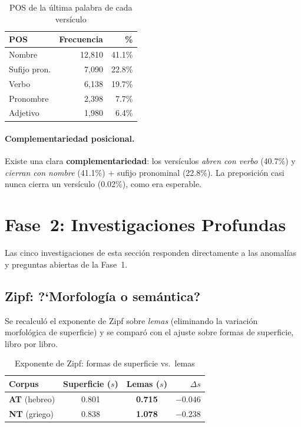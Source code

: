 \documentclass[12pt,a4paper]{article}
\newcommand{\ot}{\textcolor{otcolor}{\textbf{AT}}}
\newcommand{\nt}{\textcolor{ntcolor}{\textbf{NT}}}
\newcommand{\val}[1]{\textcolor{hlcolor}{\textbf{#1}}}
\begin{document}
\begin{table}[H]
\centering
\caption{POS de la \'ultima palabra de cada vers\'iculo}
\begin{tabular}{lrr}
\toprule
\textbf{POS} & \textbf{Frecuencia} & \textbf{\%} \\
\midrule
Nombre          & 12,810 & 41.1\% \\
Sufijo pron.    &  7,090 & 22.8\% \\
Verbo           &  6,138 & 19.7\% \\
Pronombre       &  2,398 &  7.7\% \\
Adjetivo        &  1,980 &  6.4\% \\
\bottomrule
\end{tabular}
\end{table}

\paragraph{Complementariedad posicional.}
Existe una clara \textbf{complementariedad}: los vers\'iculos \emph{abren con verbo} (40.7\%)
y \emph{cierran con nombre} (41.1\%) + sufijo pronominal (22.8\%).
La preposici\'on casi nunca cierra un vers\'iculo (0.02\%), como era esperable.


\section{Fase~2: Investigaciones Profundas}

Las cinco investigaciones de esta secci\'on responden directamente a las anomal\'ias
y preguntas abiertas de la Fase~1.

\subsection{Zipf: ?`Morfolog\'ia o sem\'antica?}

Se recalcul\'o el exponente de Zipf sobre \emph{lemas} (eliminando la variaci\'on
morfol\'ogica de superficie) y se compar\'o con el ajuste sobre formas de superficie,
libro por libro.

\begin{table}[H]
\centering
\caption{Exponente de Zipf: formas de superficie vs.\ lemas}
\label{tab:zipfdeep}
\begin{tabular}{lccr}
\toprule
\textbf{Corpus} & \textbf{Superficie ($s$)} & \textbf{Lemas ($s$)} & \textbf{$\Delta s$} \\
\midrule
\ot{} (hebreo) & 0.801 & \val{0.715} & $-0.046$ \\
\nt{} (griego) & 0.838 & \val{1.078} & $-0.238$ \\
\bottomrule
\end{tabular}
\end{table}
\end{document}
